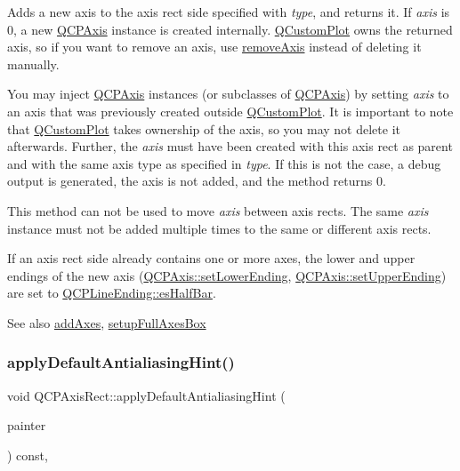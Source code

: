 Adds a new axis to the axis rect side specified with {\itshape type}, and returns it. If {\itshape axis} is 0, a new \mbox{\hyperlink{class_q_c_p_axis}{Q\+C\+P\+Axis}} instance is created internally. \mbox{\hyperlink{class_q_custom_plot}{Q\+Custom\+Plot}} owns the returned axis, so if you want to remove an axis, use \mbox{\hyperlink{class_q_c_p_axis_rect_a03c39cd9704f0d36fb6cf980cdddcbaa}{remove\+Axis}} instead of deleting it manually.

You may inject \mbox{\hyperlink{class_q_c_p_axis}{Q\+C\+P\+Axis}} instances (or subclasses of \mbox{\hyperlink{class_q_c_p_axis}{Q\+C\+P\+Axis}}) by setting {\itshape axis} to an axis that was previously created outside \mbox{\hyperlink{class_q_custom_plot}{Q\+Custom\+Plot}}. It is important to note that \mbox{\hyperlink{class_q_custom_plot}{Q\+Custom\+Plot}} takes ownership of the axis, so you may not delete it afterwards. Further, the {\itshape axis} must have been created with this axis rect as parent and with the same axis type as specified in {\itshape type}. If this is not the case, a debug output is generated, the axis is not added, and the method returns 0.

This method can not be used to move {\itshape axis} between axis rects. The same {\itshape axis} instance must not be added multiple times to the same or different axis rects.

If an axis rect side already contains one or more axes, the lower and upper endings of the new axis (\mbox{\hyperlink{class_q_c_p_axis_a08af1c72db9ae4dc8cb8a973d44405ab}{Q\+C\+P\+Axis\+::set\+Lower\+Ending}}, \mbox{\hyperlink{class_q_c_p_axis_a69119b892fc306f651763596685aa377}{Q\+C\+P\+Axis\+::set\+Upper\+Ending}}) are set to \mbox{\hyperlink{class_q_c_p_line_ending_a5ef16e6876b4b74959c7261d8d4c2cd5a126c390f0c359fcd8df1fc5e38d26d5b}{Q\+C\+P\+Line\+Ending\+::es\+Half\+Bar}}.

\begin{DoxySeeAlso}{See also}
\mbox{\hyperlink{class_q_c_p_axis_rect_a792e1f3d9cb1591fca135bb0de9b81fc}{add\+Axes}}, \mbox{\hyperlink{class_q_c_p_axis_rect_a5fa906175447b14206954f77fc7f1ef4}{setup\+Full\+Axes\+Box}} 
\end{DoxySeeAlso}
\mbox{\label{class_q_c_p_axis_rect_a4a318008e2b7f881a14c3d97186b31f9}} 
\subsubsection{\texorpdfstring{applyDefaultAntialiasingHint()}{applyDefaultAntialiasingHint()}}
{\footnotesize\ttfamily void Q\+C\+P\+Axis\+Rect\+::apply\+Default\+Antialiasing\+Hint (\begin{DoxyParamCaption}\item[{\mbox{\hyperlink{class_q_c_p_painter}{Q\+C\+P\+Painter}} $\ast$}]{painter }\end{DoxyParamCaption}) const\hspace{0.3cm}{\ttfamily [protected]}, {\ttfamily [virtual]}}



